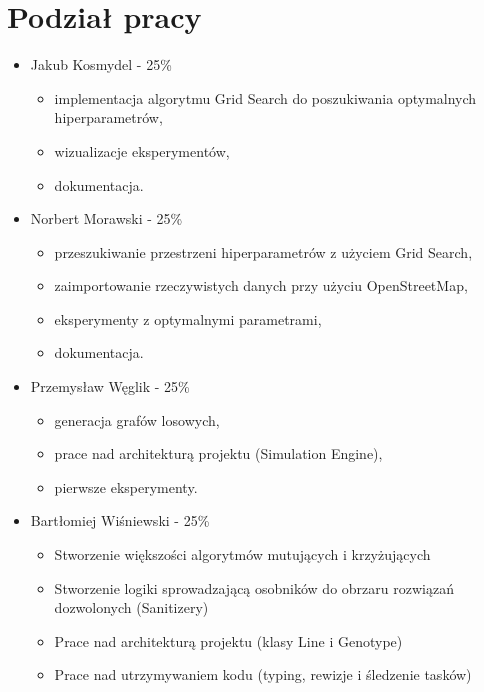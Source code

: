\documentclass[12pt,a4paper]{article}
\begin{document}
\section{Podział pracy}
\begin{itemize}
    \item Jakub Kosmydel - 25\%
    \begin{itemize}
        \item implementacja algorytmu Grid Search do poszukiwania optymalnych hiperparametrów,
        \item wizualizacje eksperymentów,
        \item dokumentacja.
    \end{itemize}
    \item Norbert Morawski - 25\%
    \begin{itemize}
        \item przeszukiwanie przestrzeni hiperparametrów z użyciem Grid Search,
        \item zaimportowanie rzeczywistych danych przy użyciu OpenStreetMap,
        \item eksperymenty z optymalnymi parametrami,
        \item dokumentacja.
    \end{itemize}
    \item Przemysław Węglik - 25\%
    \begin{itemize}
        \item generacja grafów losowych,
        \item prace nad architekturą projektu (Simulation Engine),
        \item pierwsze eksperymenty.
    \end{itemize}
    \item Bartłomiej Wiśniewski - 25\%
    \begin{itemize}
        \item Stworzenie większości algorytmów mutujących i krzyżujących
        \item Stworzenie logiki sprowadzającą osobników do obrzaru rozwiązań dozwolonych (Sanitizery)
        \item Prace nad architekturą projektu (klasy Line i Genotype)
        \item Prace nad utrzymywaniem kodu (typing, rewizje i śledzenie tasków)
    \end{itemize}
\end{itemize}
\end{document}
